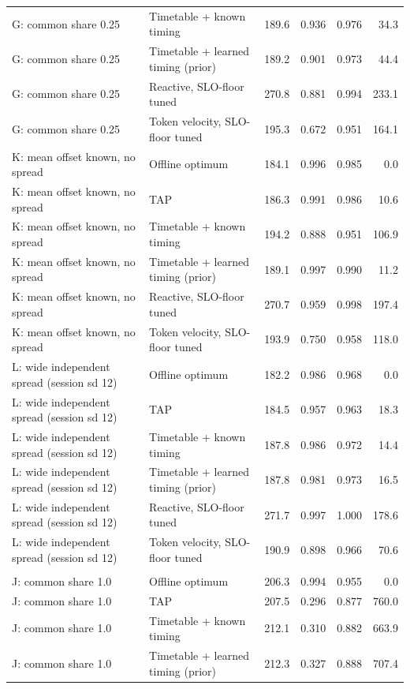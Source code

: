 \begin{tabular}{@{}llrrrr@{}}
G: common share 0.25 & Timetable + known timing & 189.6 & 0.936 & 0.976 & 34.3 \\
G: common share 0.25 & Timetable + learned timing (prior) & 189.2 & 0.901 & 0.973 & 44.4 \\
G: common share 0.25 & Reactive, SLO-floor tuned & 270.8 & 0.881 & 0.994 & 233.1 \\
G: common share 0.25 & Token velocity, SLO-floor tuned & 195.3 & 0.672 & 0.951 & 164.1 \\
K: mean offset known, no spread & Offline optimum & 184.1 & 0.996 & 0.985 & 0.0 \\
K: mean offset known, no spread & TAP & 186.3 & 0.991 & 0.986 & 10.6 \\
K: mean offset known, no spread & Timetable + known timing & 194.2 & 0.888 & 0.951 & 106.9 \\
K: mean offset known, no spread & Timetable + learned timing (prior) & 189.1 & 0.997 & 0.990 & 11.2 \\
K: mean offset known, no spread & Reactive, SLO-floor tuned & 270.7 & 0.959 & 0.998 & 197.4 \\
K: mean offset known, no spread & Token velocity, SLO-floor tuned & 193.9 & 0.750 & 0.958 & 118.0 \\
L: wide independent spread (session sd 12) & Offline optimum & 182.2 & 0.986 & 0.968 & 0.0 \\
L: wide independent spread (session sd 12) & TAP & 184.5 & 0.957 & 0.963 & 18.3 \\
L: wide independent spread (session sd 12) & Timetable + known timing & 187.8 & 0.986 & 0.972 & 14.4 \\
L: wide independent spread (session sd 12) & Timetable + learned timing (prior) & 187.8 & 0.981 & 0.973 & 16.5 \\
L: wide independent spread (session sd 12) & Reactive, SLO-floor tuned & 271.7 & 0.997 & 1.000 & 178.6 \\
L: wide independent spread (session sd 12) & Token velocity, SLO-floor tuned & 190.9 & 0.898 & 0.966 & 70.6 \\
\addlinespace
\multicolumn{6}{@{}l}{\emph{72B (c3)}} \\
J: common share 1.0 & Offline optimum & 206.3 & 0.994 & 0.955 & 0.0 \\
J: common share 1.0 & TAP & 207.5 & 0.296 & 0.877 & 760.0 \\
J: common share 1.0 & Timetable + known timing & 212.1 & 0.310 & 0.882 & 663.9 \\
J: common share 1.0 & Timetable + learned timing (prior) & 212.3 & 0.327 & 0.888 & 707.4 \\

\end{tabular}
